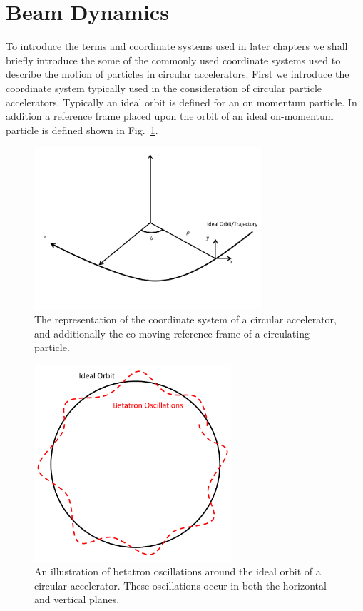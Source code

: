\section{Beam Dynamics}
\label{sec:BeamDyn}

To introduce the terms and coordinate systems used in later chapters we shall briefly introduce the some of the commonly used coordinate systems used to describe the motion of particles in circular accelerators. First we introduce the coordinate system typically used in the consideration of circular particle accelerators. Typically an ideal orbit is defined for an on momentum particle. In addition a reference frame placed upon the orbit of an ideal on-momentum particle is defined shown in Fig.~\ref{fig:accel-coord-system}. 

\begin{figure}
\begin{center}
\includegraphics[width=0.75\textwidth]{Introduction/figures/coordinate-system.pdf}
\end{center}
\caption{The representation of the coordinate system of a circular accelerator, and additionally the co-moving reference frame of a circulating particle.}
\label{fig:accel-coord-system}
\end{figure}

\begin{figure}
\begin{center}
\includegraphics[width=0.65\textwidth]{Introduction/figures/betatron-motion.pdf}
\end{center}
\caption{An illustration of betatron oscillations around the ideal orbit of a circular accelerator. These oscillations occur in both the horizontal and vertical planes.}
\label{fig:betatron-motion}
\end{figure}

